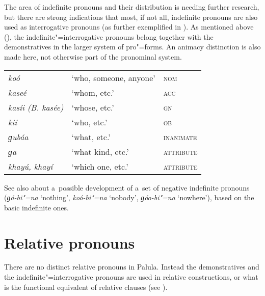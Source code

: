 The area of indefinite pronouns and their distribution is needing further research, but there are strong indications that most, if not all, indefinite pronouns are also used as interrogative pronouns (as further exemplified in ). As mentioned above (), the indefinite"=interrogative pronouns belong together with the demonstratives in the larger system of pro"=forms. An animacy distinction is also made here, not otherwise part of the pronominal system.

\begin{table}[H]
\begin{tabularx}{\textwidth}{ l l l }
\textit{koó} &
`who, someone, anyone' &
\textsc{nom} \\
\textit{kaseé} &
`whom, etc.' &
\textsc{acc}\\
\textit{kasíi (B. kasée)} &
`whose, etc.' &
\textsc{gn} \\
\textit{kií} &
`who, etc.' &
\textsc{ob} \\
\textit{ɡubáa} &
`what, etc.' &
\textsc{inanimate} \\
\textit{ɡa} &
`what kind, etc.' &
\textsc{attribute} \\
\textit{khayú, khayí} &
`which one, etc.' &
\textsc{attribute} \\
\end{tabularx}
\end{table}

See also  about a~possible development of a~set of negative indefinite pronouns (\textit{ɡá-bi"=na} `nothing', \textit{koó-bi"=na} `nobody', \textit{ɡóo-bi"=na} `nowhere'), based on the basic indefinite ones.

\section{Relative pronouns}
\label{sec:5-8}


There are no distinct relative pronouns in Palula. Instead the demonstratives and the indefinite"=interrogative pronouns are used in relative constructions, or what is the functional equivalent of relative clauses (see ).